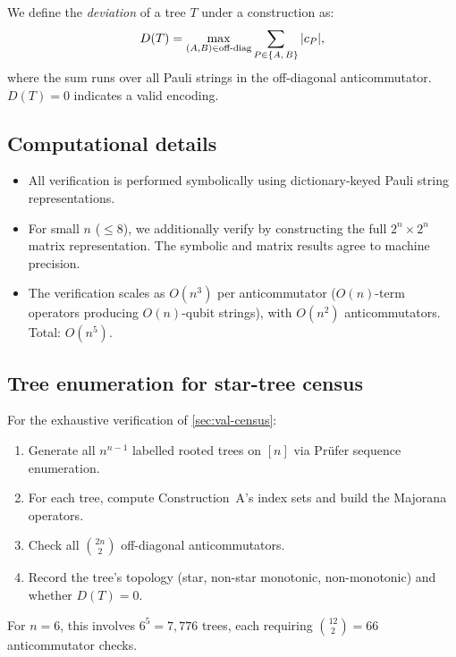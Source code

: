 We define the \emph{deviation} of a tree $T$ under a construction as:
\begin{equation}
  D(T) = \max_{(A,B) \in \text{off-diag}}
    \sum_{P \in \{A,\,B\}} |c_P|,
\end{equation}
where the sum runs over all Pauli strings in the off-diagonal
anticommutator.  $D(T) = 0$ indicates a valid encoding.

\subsection*{Computational details}

\begin{itemize}
  \item All verification is performed symbolically using
    dictionary-keyed Pauli string representations.
  \item For small $n$ ($\le 8$), we additionally verify by
    constructing the full $2^n \times 2^n$ matrix representation.
    The symbolic and matrix results agree to machine precision.
  \item The verification scales as $O(n^3)$ per anticommutator
    ($O(n)$-term operators producing $O(n)$-qubit strings), with
    $O(n^2)$ anticommutators.  Total: $O(n^5)$.
\end{itemize}

\subsection*{Tree enumeration for star-tree census}

For the exhaustive verification of \cref{sec:val-census}:
\begin{enumerate}
  \item Generate all $n^{n-1}$ labelled rooted trees on $[n]$ via
    Pr\"ufer sequence enumeration.
  \item For each tree, compute Construction~A's index sets and
    build the Majorana operators.
  \item Check all $\binom{2n}{2}$ off-diagonal anticommutators.
  \item Record the tree's topology (star, non-star monotonic,
    non-monotonic) and whether $D(T) = 0$.
\end{enumerate}

For $n = 6$, this involves $6^5 = 7{,}776$ trees, each requiring
$\binom{12}{2} = 66$ anticommutator checks.
